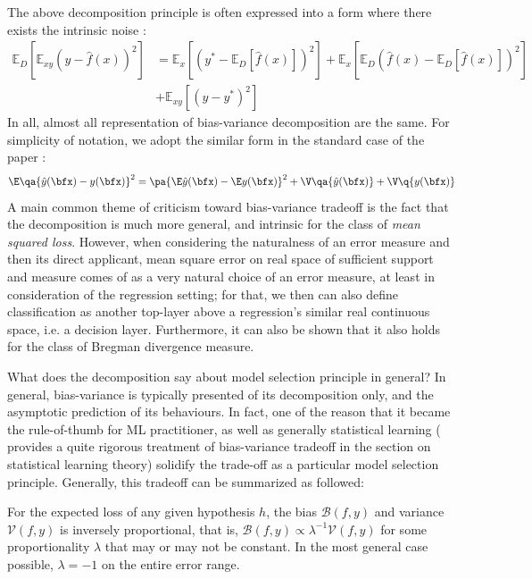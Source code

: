 \documentclass[10pt]{article} %
\begin{document}
The above decomposition principle is often expressed into a form where there exists the intrinsic noise \cite{brown2024biasvariance}: 
\begin{equation}
    \begin{split}
        \mathbb{E}_D \left[ \mathbb{E}_{xy} \left( y - \hat{f}(x) \right)^2 \right]
        &= 
         \mathbb{E}_x \left[ \left( y^* - \mathbb{E}_D[\hat{f}(x)] \right)^2 \right]
        + \mathbb{E}_x \left[ \mathbb{E}_D \left( \hat{f}(x) - \mathbb{E}_D[\hat{f}(x)] \right)^2 \right] \\
        &+ \mathbb{E}_{xy} \left[ \left( y - y^* \right)^2 \right]
    \end{split}
    \end{equation}
In all, almost all representation of bias-variance decomposition are the same. For simplicity of notation, we adopt the similar form in the standard case of the paper \cite{adlam2020understandingdoubledescentrequires}: 
\begin{equation}
    \E \qa{\hat{y}(\bfx)-y(\bfx)}^2 = \pa{\E\hat{y}(\bfx) - \E y(\bfx)}^2 + \V\qa{\hat{y}(\bfx)} + \V\q{y(\bfx)}
\end{equation}
A main common theme of criticism toward bias-variance tradeoff is the fact that the decomposition is much more general, and intrinsic for the class of \textit{mean squared loss}. However, when considering the naturalness of an error measure and then its direct applicant, mean square error on real space of sufficient support and measure comes of as a very natural choice of an error measure, at least in consideration of the regression setting; for that, we then can also define classification as another top-layer above a regression's similar real continuous space, i.e. a decision layer. Furthermore, it can also be shown \cite{brown2024biasvariance,PfauBregmanDivergence} that it also holds for the class of Bregman divergence measure. 

What does the decomposition say about model selection principle in general? In general, bias-variance is typically presented of its decomposition only, and the asymptotic prediction of its behaviours. In fact, one of the reason that it became the rule-of-thumb for ML practitioner, as well as generally statistical learning (\cite{lafon_understanding_2024} provides a quite rigorous treatment of bias-variance tradeoff in the section on statistical learning theory) solidify the trade-off as a particular model selection principle. Generally, this tradeoff can be summarized as followed: 
\begin{theorem}\label{thm:bias-variance}
    For the expected loss of any given hypothesis $h$, the bias $\mathcal{B}(f,y)$ and variance $\mathcal{V}(f,y)$ is inversely proportional, that is, $\mathcal{B}(f,y)\propto \lambda^{-1} \mathcal{V}(f,y)$ for some proportionality $\lambda$ that may or may not be constant. In the most general case possible, $\lambda = -1$ on the entire error range. 
\end{theorem}
\end{document}
